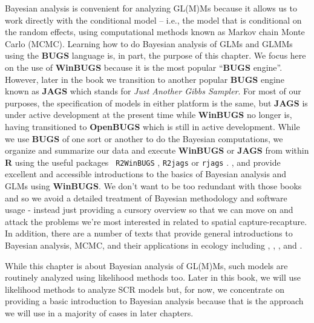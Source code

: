 Bayesian analysis is convenient for analyzing GL(M)Ms because it allows
us to work directly with the conditional model -- i.e., the model that
is conditional on the random effects, using computational methods
known as Markov chain Monte Carlo (MCMC). Learning how to do Bayesian
analysis of GLMs and GLMMs using the {\bf BUGS} language is, in part, the purpose
of this chapter. We focus here on the use of {\bf WinBUGS} because it
is the most popular ``{\bf BUGS} engine''. However, later in the book
we transition to another popular {\bf BUGS} engine known as {\bf
  JAGS} \citep{plummer:2009} which stands for {\it Just Another Gibbs
  Sampler}. For most of our purposes, the specification of models in
either platform is the same, but {\bf JAGS} is under active
development at the present time while {\bf WinBUGS} no longer is,
having transitioned to 
{\bf OpenBUGS} \citep{lunn_etal:2009} which is still in active
development.  
 While we use {\bf BUGS} of one sort or another to do the Bayesian
computations, we organize and summarize our data and execute {\bf
  WinBUGS} or {\bf JAGS} from within {\bf R} using the useful packages 
\mbox{\tt
  R2WinBUGS} \citep{sturtz_etal:2005}, \mbox{\tt R2jags} \citep{su_yajima:2011} or \mbox{\tt rjags} \citep{plummer:2009}.  \citet{kery:2010}, and
\citet{kery_schaub:2011} provide excellent and accessible introductions to the basics
of Bayesian analysis and GLMs using {\bf WinBUGS}.
We don't want to
be too redundant with those books and so we avoid a detailed
treatment of Bayesian methodology and software usage - instead just providing a cursory
overview so that we can move on and attack the problems we're most
interested in related to spatial capture-recapture.  In addition,
there are a number of texts that provide general introductions to
Bayesian analysis, MCMC, and their applications in ecology including
\citet{mccarthy:2007}, \citet{kery:2010}, \citet{link_barker:2010}, and
\citet{king_etal:2009}.


While this chapter is about Bayesian analysis of GL(M)Ms, such models
are routinely analyzed using likelihood methods too.
Later in
this book, we will use likelihood methods to analyze SCR models but,
for now, we concentrate on providing a basic introduction to Bayesian
analysis because that is the approach we will use in a majority of
cases in later chapters.



